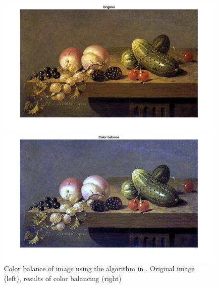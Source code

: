 \documentclass[conference]{IEEEtran}
\begin{document}
\begin{figure}[ht]
\begin{multicols}{2}
    \includegraphics[width=\linewidth]{colbal21.png}\par 
    \includegraphics[width=\linewidth]{colbal22.png}\par 
    \end{multicols}
\caption{Color balance of image using the algorithm in \cite{colbal}. Original image (left), results of color balancing (right)}
\label{colbal_2}
\end{figure}


%


\end{document}
